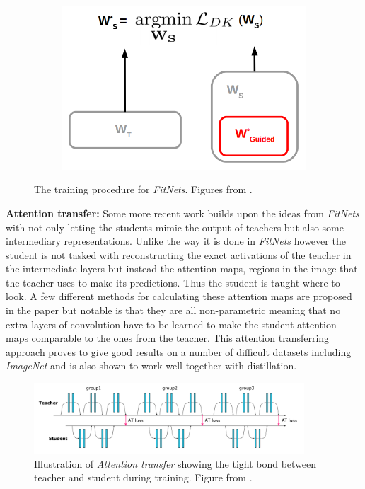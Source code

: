 \documentclass{kththesis}
\newcommand{\bibentry}[1]{\parencite{#1}}
\newcommand{\subsubsubsection}[1]{\vspace{5px}\noindent\textbf{#1:}}
\begin{document}
\begin{figure}[h]
    \begin{subfigure}[b]{0.3\textwidth}
        \includegraphics[width=\textwidth]{FitNet_C}
      \end{subfigure}
      \caption{The training procedure for \textit{FitNets}. Figures from \textcite[]{romero2014fitnets}.}\label{fig:FitNets}
      \label{fig:FitNet}
\end{figure}

\subsubsubsection{Attention transfer}
Some more recent work \bibentry{zagouruyko2017paying} builds upon the ideas from
\emph{FitNets} with not only letting the students mimic the output of teachers
but also some intermediary representations. Unlike the way it is done in
\emph{FitNets} however the student is not tasked with reconstructing the exact
activations of the teacher in the intermediate layers but instead the attention
maps, regions in the image that the teacher uses to make its predictions.
Thus the student is taught where to look. A few different methods for calculating
these attention maps are proposed in the paper but notable is that they are all
non-parametric meaning that no extra layers of convolution have to be learned to
make the student attention maps comparable to the ones from the teacher. This
attention transferring approach proves to give good results on a number of
difficult datasets including \emph{ImageNet} and is also shown to work well
together with distillation. 

\begin{figure}[h]
  \centering
  \includegraphics[width=0.9\textwidth]{AttentionTransfer}
  \caption{Illustration of \textit{Attention transfer} showing the tight bond
    between teacher and student during training. Figure from \textcite[]{zagouruyko2017paying}.}
  \label{fig:AttentionTransfer}
\end{figure}
\end{document}
